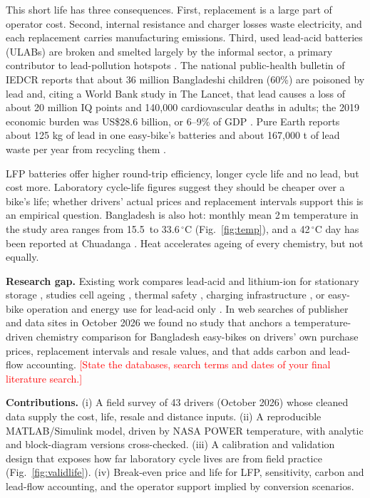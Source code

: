 \documentclass[11pt,a4paper]{article}
\newcommand{\figref}[1]{Fig.~\ref{fig:#1}}
\newcommand{\todo}[1]{\textcolor{red}{#1}}%
\newcommand{\nSurvey}{43}
\newcommand{\Tmin}{15.5}
\newcommand{\Tmax}{33.6}
\begin{document}
This short life has three consequences. First, replacement is a large part of operator cost. Second, internal resistance and charger losses waste electricity, and each replacement carries manufacturing emissions. Third, used lead-acid batteries (ULABs) are broken and smelted largely by the informal sector, a primary contributor to lead-pollution hotspots \cite{esdo2021}. The national public-health bulletin of IEDCR reports that about 36 million Bangladeshi children (60\%) are poisoned by lead and, citing a World Bank study in The Lancet, that lead causes a loss of about 20 million IQ points and 140{,}000 cardiovascular deaths in adults; the 2019 economic burden was US\$28.6 billion, or 6--9\% of GDP \cite{das2026}. Pure Earth reports about 125 kg of lead in one easy-bike's batteries and about 167{,}000 t of lead waste per year from recycling them \cite{fe2024,pureearth_smep}.

LFP batteries offer higher round-trip efficiency, longer cycle life and no lead, but cost more. Laboratory cycle-life figures suggest they should be cheaper over a bike's life; whether drivers' actual prices and replacement intervals support this is an empirical question. Bangladesh is also hot: monthly mean 2\,m temperature in the study area ranges from \Tmin\ to \Tmax\,$^\circ$C (\figref{temp}), and a 42\,$^\circ$C day has been reported at Chuadanga \cite{heat2025}. Heat accelerates ageing of every chemistry, but not equally.

\textbf{Research gap.} Existing work compares lead-acid and lithium-ion for stationary storage \cite{keshan2016,yudhistira2022,jasper2025}, studies cell ageing \cite{yagci2026}, thermal safety \cite{schoberl2024}, charging infrastructure \cite{hasan2020}, or easy-bike operation and energy use for lead-acid only \cite{chowdhury2026,peakdemand}. In web searches of publisher and data sites in October 2026 we found no study that anchors a temperature-driven chemistry comparison for Bangladesh easy-bikes on drivers' own purchase prices, replacement intervals and resale values, and that adds carbon and lead-flow accounting. \todo{[State the databases, search terms and dates of your final literature search.]}

\textbf{Contributions.} (i) A field survey of \nSurvey{} drivers (October 2026) whose cleaned data supply the cost, life, resale and distance inputs. (ii) A reproducible MATLAB/Simulink model, driven by NASA POWER temperature, with analytic and block-diagram versions cross-checked. (iii) A calibration and validation design that exposes how far laboratory cycle lives are from field practice (\figref{validlife}). (iv) Break-even price and life for LFP, sensitivity, carbon and lead-flow accounting, and the operator support implied by conversion scenarios.
\end{document}
